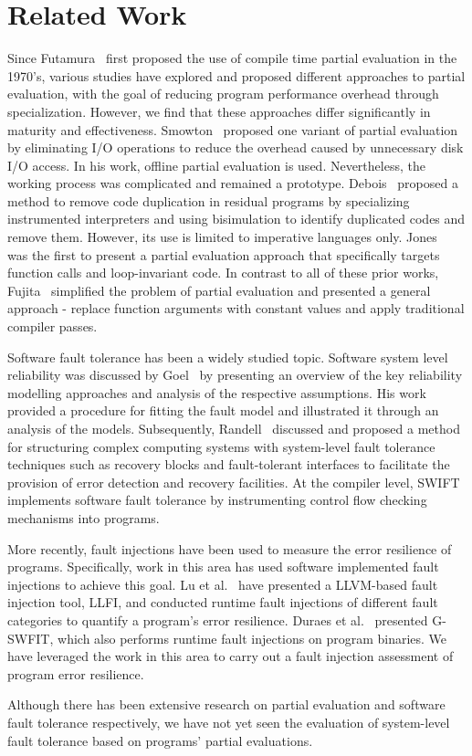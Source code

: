 \section{Related Work}
\label{sec:related-work}

Since Futamura~\cite{Futamura} first proposed the use of compile time partial evaluation in the 1970’s, various studies have explored and proposed different approaches to partial evaluation, with the goal of reducing program performance overhead through specialization. 
However, we find that these approaches differ significantly in maturity and effectiveness.
Smowton~\cite{Smowton} proposed one variant of partial evaluation by eliminating I/O operations to reduce the overhead caused by unnecessary disk I/O access. In his work, offline partial evaluation is used.
Nevertheless, the working process was complicated and remained a prototype.
Debois~\cite{Debois} proposed a method to remove code duplication in residual programs by specializing instrumented interpreters and using bisimulation to identify duplicated codes and remove them.
However, its use is limited to imperative languages only.
Jones~\cite{Jones1996} was the first to present a partial evaluation approach that specifically targets function calls and loop-invariant code.
In contrast to all of these prior works, Fujita~\cite{Fujita} simplified the problem of partial evaluation and presented a general approach - replace function arguments with constant values and apply traditional compiler passes. 

Software fault tolerance has been a widely studied topic.
Software system level reliability was discussed by Goel~\cite{Softwarereliability} by presenting an overview of the key reliability modelling approaches and analysis of the respective assumptions.
His work provided a procedure for fitting the fault model and illustrated it through an analysis of the models.
Subsequently, Randell~\cite{Randell} discussed and proposed a method for structuring complex computing systems with system-level fault tolerance techniques such as recovery blocks and fault-tolerant interfaces to facilitate the provision of error detection and recovery facilities. 
At the compiler level, SWIFT~\cite{SWIFT} implements software fault tolerance by instrumenting control flow checking mechanisms into programs.

More recently, fault injections have been used to measure the error resilience of programs.
Specifically, work in this area has used software implemented fault injections to achieve this goal.
Lu et al.~\cite{LLFI} have presented a LLVM-based fault injection tool, LLFI, and conducted runtime fault injections of different fault categories to quantify a program's error resilience.
Duraes et al.~\cite{Duraes2006} presented G-SWFIT, which also performs runtime fault injections on program binaries.
We have leveraged the work in this area to carry out a fault injection assessment of program error resilience. 

Although there has been extensive research on partial evaluation and software fault tolerance respectively, we have not yet seen the evaluation of system-level fault tolerance based on programs' partial evaluations.
